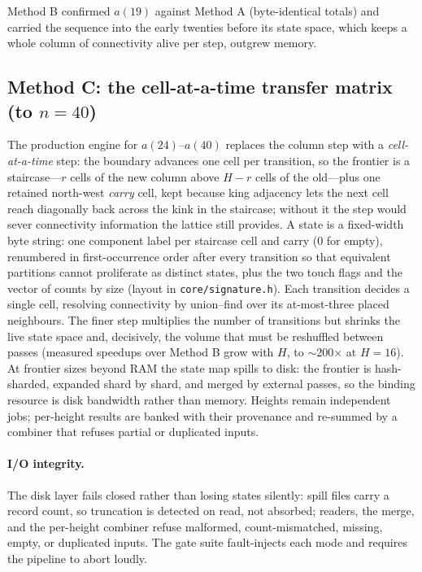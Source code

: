 \documentclass[11pt]{article}
\begin{document}
Method B confirmed $a(19)$ against Method A (byte-identical totals) and
carried the sequence into the early twenties before its state space, which
keeps a whole column of connectivity alive per step, outgrew memory.

\subsection{Method C: the cell-at-a-time transfer matrix (to $n=40$)}
\label{sec:methodC}

The production engine for $a(24)$--$a(40)$ replaces the column step with a
\emph{cell-at-a-time} step: the boundary advances one cell per transition,
so the frontier is a staircase---$r$ cells of the new column above $H-r$
cells of the old---plus one retained north-west \emph{carry} cell, kept
because king adjacency lets the next cell reach diagonally back across the
kink in the staircase; without it the step would sever connectivity
information the lattice still provides. A state is a fixed-width byte
string: one component label per staircase cell and carry ($0$ for empty),
renumbered in first-occurrence order after every transition so that
equivalent partitions cannot proliferate as distinct states, plus the two
touch flags and the vector of counts by size (layout in
\texttt{core/signature.h}). Each transition decides a single cell,
resolving connectivity by union--find over its at-most-three placed
neighbours. The finer step multiplies the number of transitions but shrinks
the live state space and, decisively, the volume that must be reshuffled
between passes (measured speedups over Method B grow with $H$, to
$\sim$200$\times$ at $H=16$). At frontier sizes beyond RAM the
state map spills to disk: the frontier is hash-sharded, expanded shard by
shard, and merged by external passes, so the binding resource is disk
bandwidth rather than memory. Heights remain independent jobs; per-height
results are banked with their provenance and re-summed by a combiner that
refuses partial or duplicated inputs.

\paragraph{I/O integrity.}
The disk layer fails closed rather than losing states silently: spill files
carry a record count, so truncation is detected on read, not
absorbed; readers, the merge, and the per-height combiner refuse malformed,
count-mismatched, missing, empty, or duplicated inputs. The gate suite
fault-injects each mode and requires the pipeline to abort loudly.
\end{document}
